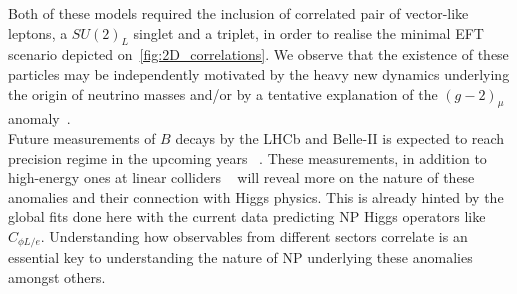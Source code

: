 Both of these models required the inclusion of correlated pair of vector-like leptons, a $SU(2)_L$ singlet and a triplet, in order to realise the minimal EFT scenario depicted on~\autoref{fig:2D_correlations}. We observe that the existence of these particles may be independently motivated by the heavy new dynamics underlying the origin of neutrino masses and/or by a tentative explanation of the $(g-2)_{\mu}$ anomaly~\cite{Kannike:2011ng,Muong-2:2021ojo}.\\

Future measurements of $B$ decays by the LHCb and Belle-II  is expected to reach precision regime in the upcoming years ~\cite{Kou:2018nap,Bediaga:2018lhg}. These measurements, in addition to high-energy ones at linear colliders ~\cite{deBlas:2019rxi,deBlas:2019wgy} will reveal more on the nature of these anomalies and their connection with Higgs physics. This is already hinted by the global fits done here with the current data predicting NP Higgs operators like $ C_{\phi L/e}$. Understanding how observables from different sectors correlate is an essential key to understanding the nature of NP underlying these anomalies amongst others.


%
%

